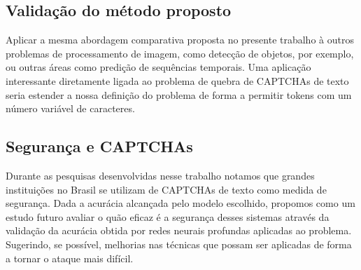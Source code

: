 \subsection*{Validação do método proposto}
Aplicar a mesma abordagem comparativa proposta no presente trabalho à outros problemas de processamento de imagem, como detecção de objetos, por exemplo, ou outras áreas como predição de sequências temporais. Uma aplicação interessante diretamente ligada ao problema de quebra de CAPTCHAs de texto seria estender a nossa definição do problema de forma a permitir tokens com um número variável de caracteres. 

\subsection*{Segurança e CAPTCHAs}
Durante as pesquisas desenvolvidas nesse trabalho notamos que grandes instituições no Brasil se utilizam de CAPTCHAs de texto como medida de segurança. Dada a acurácia alcançada pelo modelo escolhido, propomos como um estudo futuro avaliar o quão eficaz é a segurança desses sistemas através da validação da acurácia obtida por redes neurais profundas aplicadas ao problema. Sugerindo, se possível, melhorias nas técnicas que possam ser aplicadas de forma a tornar o ataque mais difícil.
